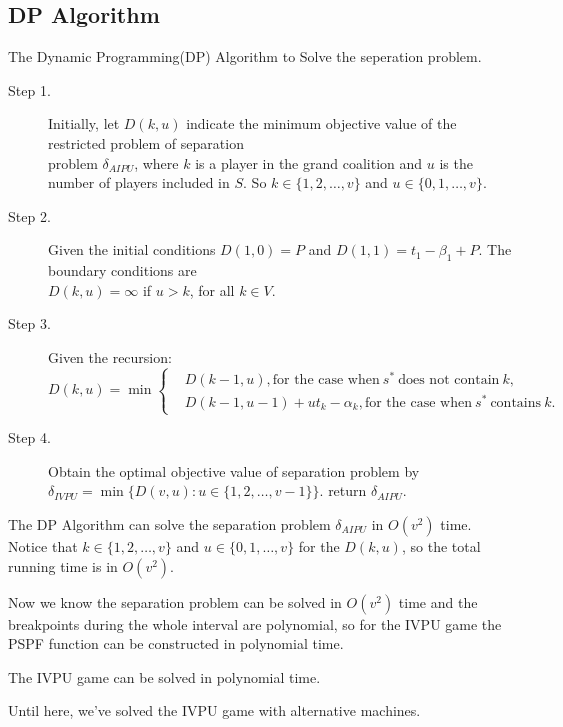 \subsection{DP Algorithm}

\begin{algorithm}[h]\label{algoDP}
\caption{The Dynamic Programming(DP) Algorithm to Solve the seperation problem.}
\begin{algorithmic}[1]

\begin{description}
  \item[Step 1.] Initially, let $D(k,u)$ indicate the minimum objective value of the restricted problem of separation \\
  \vspace{10pt}
  problem $\delta_{AIPU}$, where $k$ is a player in the grand coalition and $u$ is the number of players included in $S$. So $ k \in \{1,2,\ldots,v\}$ and $u\in \{0,1,\ldots,v\}$.

  \item[Step 2.] Given the initial conditions $D(1,0) = P$ and $D(1,1) = t_1 - \beta_1 +P$. The boundary conditions are \\
  \vspace{10pt}
  $D(k,u) = \infty$ if $u > k$, for all $k \in V$.
  \item[Step 3.] Given the recursion:
  \begin{equation*}
  D(k,u)= \min \left\{
  \begin{aligned}
  & D(k-1,u), \text{for the case when} \ s^* \ \text{does not contain} \ k, \\
  & D(k-1,u-1) + u t_k - \alpha_k ,\text{for the case when} \ s^* \ \text{contains} \ k.
  \end{aligned}
  \right.
  \end{equation*}

  \item[Step 4.] Obtain the optimal objective value of separation problem by
  $\delta_{IVPU} = \min\{D(v,u): u\in \{1,2,\ldots,v-1\}\}$.
   return $\delta_{AIPU}$.
\end{description}

\end{algorithmic}
\end{algorithm}

{The DP Algorithm can solve the separation problem $\delta_{AIPU}$ in $O(v^2)$ time.}
Notice that $k \in \{1,2,\ldots,v\}$ and $u\in \{0,1,\ldots,v\}$ for the $D(k,u)$, so the total running time is in $O(v^2)$.

Now we know the separation problem can be solved in $O(v^2)$ time and the breakpoints during the whole interval are polynomial, so for the IVPU game the PSPF function can be constructed in polynomial time.

\begin{thm}\label{thm6}
The IVPU game can be solved in polynomial time.
\end{thm}

Until here, we've solved the IVPU game with alternative machines.
